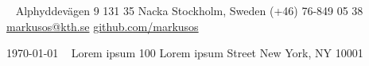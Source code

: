 \documentclass{markusos-letter}
\begin{document}


\begin{aside_right}
~
Alphyddevägen 9
131 35 Nacka
Stockholm, Sweden
(+46) 76-849 05 38
\href{mailto:markusos@kth.se}{markusos@kth.se}
\href{https://github.com/markusos}{github.com/markusos}
\end{aside_right}

\begin{aside_left}
\today\vspace{5pt}
~
Lorem ipsum
100 Lorem ipsum Street
New York, NY 10001
~
\end{aside_left}


\begin{entrylist}


\end{entrylist}
\end{document}
